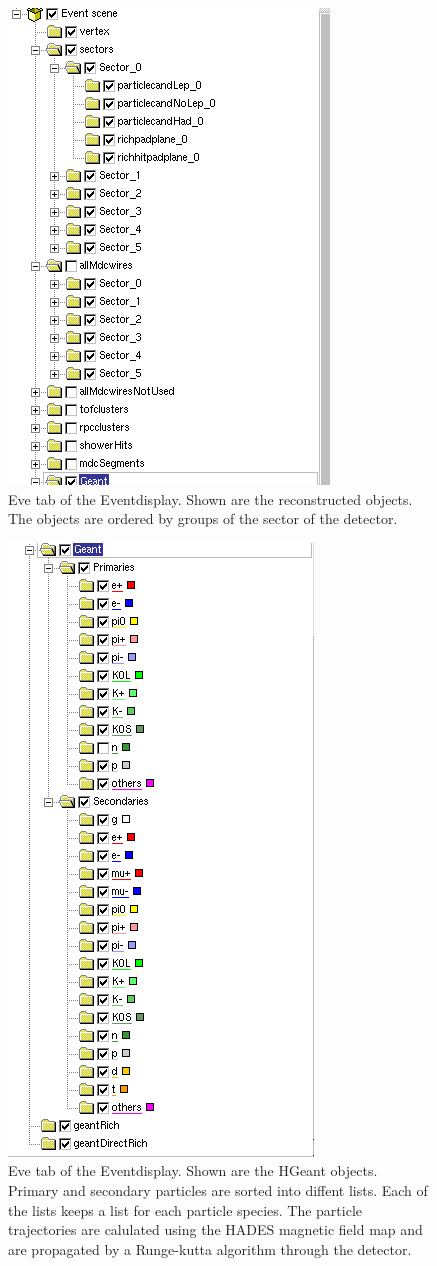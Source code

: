 \begin{figure}[\htb]
\begin{center}
\includegraphics[width=0.4\linewidth,clip=true]{pics/eventdisplay/treeReco.png}
\caption[Eventdisplay eve tab - reco objects]{Eve tab of the Eventdisplay. 
Shown are the reconstructed objects. The objects are ordered by groups of the 
sector of the detector.} \label{eventdisplay_tree_reco}
\end{center}
\end{figure}

\begin{figure}[\htb]
\begin{center}
\includegraphics[width=0.4\linewidth,clip=true]{pics/eventdisplay/treeGeant.png}
\caption[Eventdisplay eve tab - HGeant objects]{Eve tab of the Eventdisplay. Shown are the HGeant 
objects. Primary and secondary particles are sorted into diffent lists. Each of the
lists keeps a list for each particle species. The particle trajectories are calulated using
the HADES magnetic field map and are propagated by a Runge-kutta algorithm through the 
detector.} \label{eventdisplay_tree_geant}
\end{center}
\end{figure}



